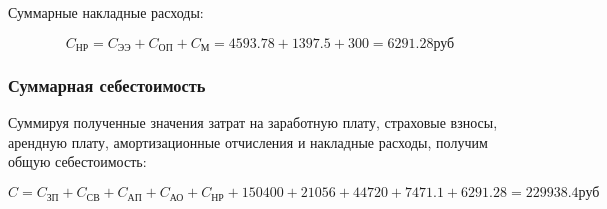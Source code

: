 \vspace{1em}

Суммарные накладные расходы:

$$ C_\text{НР} = C_\text{ЭЭ} + C_\text{ОП} + C_\text{М}
= 4593.78 + 1397.5 + 300 = 6291.28 \text{руб} $$ 

\subsubsection{Суммарная себестоимость}

Суммируя полученные значения затрат на заработную плату, страховые
взносы, арендную плату, амортизационные отчисления и накладные расходы,
получим общую себестоимость:

$$ C = C_\text{ЗП} + C_\text{СВ} + C_\text{АП} + C_\text{АО} + C_\text{НР} +
150400 + 21056 + 44720 + 7471.1 + 6291.28 = 229938.4 \text{руб} $$ 
